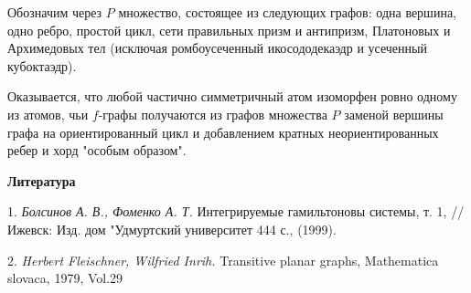 	
	
	Обозначим через $P$ множество, состоящее из следующих графов: одна вершина, одно ребро, простой цикл, сети правильных призм и антипризм, Платоновых и Архимедовых тел (исключая ромбоусеченный икосододекаэдр и усеченный кубоктаэдр).
	
	
	
 Оказывается, что любой частично симметричный атом изоморфен ровно одному из атомов, чьи $f$-графы получаются из  графов множества $P$ заменой вершины графа на ориентированный цикл и  добавлением кратных неориентированных ребер и хорд "особым образом".






\smallskip \centerline {\bf Литература} \nopagebreak

1. {\it Болсинов А. В., Фоменко А. Т.} Интегрируемые гамильтоновы системы, т. 1, // Ижевск: Изд. дом "Удмуртский университет 444 с., (1999).

2. {\it Herbert Fleischner, Wilfried Inrih.} Transitive planar graphs, Mathematica slovaca, 1979, Vol.29


